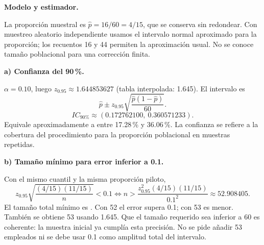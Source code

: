 \textbf{Modelo y estimador.}\par\nopagebreak[4]
La proporción muestral es $\widehat p=16/60=4/15$, que se conserva sin redondear. Con muestreo aleatorio independiente usamos el intervalo normal aproximado para la proporción; los recuentos 16 y 44 permiten la aproximación usual. No se conoce tamaño poblacional para una corrección finita.

\textbf{a) Confianza del 90\,\%.}\par\nopagebreak[4]
$\alpha=0.10$, luego $z_{0.95}\approx1.644853627$ (tabla interpolada: 1.645). El intervalo es
\[
\widehat p\pm z_{0.95}\sqrt{\frac{\widehat p(1-\widehat p)}{60}}.
\]
\[
\boxed{IC_{\text{90\%}}\approx(0.172762100,\ 0.360571233).}
\]
Equivale aproximadamente a entre 17.28\,\% y 36.06\,\%. La confianza se refiere a la cobertura del procedimiento para la proporción poblacional en muestras repetidas.

\textbf{b) Tamaño mínimo para error inferior a 0.1.}\par\nopagebreak[4]
Con el mismo cuantil y la misma proporción piloto,
\[
z_{0.95}\sqrt{\frac{(4/15)(11/15)}n}<0.1
\iff n>\frac{z_{0.95}^2(4/15)(11/15)}{0.1^2}
\approx52.908405.
\]
El tamaño total mínimo es . Con 52 el error supera 0.1; con 53 es menor. También se obtiene 53 usando 1.645. Que el tamaño requerido sea inferior a 60 es coherente: la muestra inicial ya cumplía esta precisión. No se pide añadir 53 empleados ni se debe usar 0.1 como amplitud total del intervalo.
